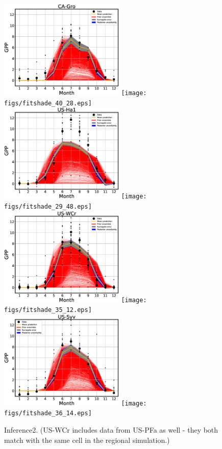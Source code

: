 \documentclass[12pt]{article}
\begin{document}
\begin{figure}[!hb]
\includegraphics[width=0.53\textwidth]{figs/fit1d_40_28.eps}\hfill
\texttt{[image: figs/fitshade\_40\_28.eps]}\\
\includegraphics[width=0.53\textwidth]{figs/fit1d_29_48.eps}\hfill
\texttt{[image: figs/fitshade\_29\_48.eps]}\\
\includegraphics[width=0.53\textwidth]{figs/fit1d_35_12.eps}\hfill
\texttt{[image: figs/fitshade\_35\_12.eps]}\\
\includegraphics[width=0.53\textwidth]{figs/fit1d_36_14.eps}\hfill
\texttt{[image: figs/fitshade\_36\_14.eps]}
\caption{\label{fig:fits2} Inference2. (US-WCr includes data from US-PFa as well - they both match with the same cell in the regional simulation.)}
\end{figure}
\end{document}
